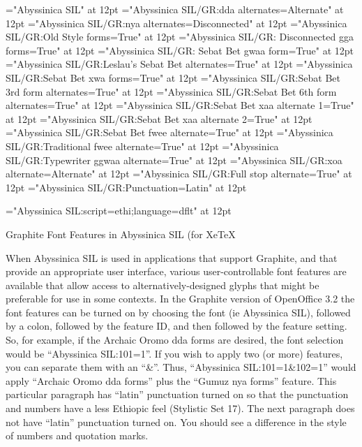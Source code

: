 
\nopagenumbers
\parindent=0pt

\def\StylisticSet{\vskip 12pt\A \parindent=0pt}
\def\IndSS{\par\A \parindent=12pt}


\font\A="Abyssinica SIL" at 12pt
\font\Oromo="Abyssinica SIL/GR:dda alternates=Alternate" at 12pt
\font\Gumuz="Abyssinica SIL/GR:nya alternates=Disconnected" at 12pt
\font\OldStyle="Abyssinica SIL/GR:Old Style forms=True" at 12pt
\font\Disconnected="Abyssinica SIL/GR: Disconnected gga forms=True" at 12pt
\font\SBDef="Abyssinica SIL/GR: Sebat Bet gwaa form=True" at 12pt
\font\Leslau="Abyssinica SIL/GR:Leslau's Sebat Bet alternates=True" at 12pt
\font\xwa="Abyssinica SIL/GR:Sebat Bet xwa forms=True" at 12pt
\font\SBThree="Abyssinica SIL/GR:Sebat Bet 3rd form alternates=True" at 12pt
\font\SBSix="Abyssinica SIL/GR:Sebat Bet 6th form alternates=True" at 12pt
\font\xaaOne="Abyssinica SIL/GR:Sebat Bet xaa alternate 1=True" at 12pt
\font\xaaTwo="Abyssinica SIL/GR:Sebat Bet xaa alternate 2=True" at 12pt
\font\SBfwee="Abyssinica SIL/GR:Sebat Bet fwee alternate=True" at 12pt
\font\fwee="Abyssinica SIL/GR:Traditional fwee alternate=True" at 12pt
\font\ggwaa="Abyssinica SIL/GR:Typewriter ggwaa alternate=True" at 12pt
\font\xoa="Abyssinica SIL/GR:xoa alternate=Alternate" at 12pt
\font\Fullstop="Abyssinica SIL/GR:Full stop alternate=True" at 12pt
\font\Punct="Abyssinica SIL/GR:Punctuation=Latin" at 12pt

\font\C="Abyssinica SIL:script=ethi;language=dflt" at 12pt

\A Graphite Font Features in Abyssinica SIL (for XeTeX

\StylisticSet\Punct When Abyssinica SIL is used in applications that support Graphite, and that provide an appropriate user interface, various user-controllable font features are available that allow access to alternatively-designed glyphs that might be preferable for use in some contexts. In the Graphite version of OpenOffice 3.2  the font features can be turned on by choosing the font (ie Abyssinica SIL), followed by a colon, followed by the feature ID, and then followed by the feature setting. So, for example, if the Archaic Oromo dda forms are desired, the font selection would be “Abyssinica SIL:101=1”. If you wish to apply two (or more) features, you can separate them with an “\&”. Thus, “Abyssinica SIL:101=1\&102=1” would apply “Archaic Oromo dda forms” plus the “Gumuz nya forms” feature. This particular paragraph has “latin” punctuation turned on so that the punctuation and numbers have a less Ethiopic feel (Stylistic Set 17). The next paragraph does not have “latin” punctuation turned on. You should see a difference in the style of numbers and quotation marks.


